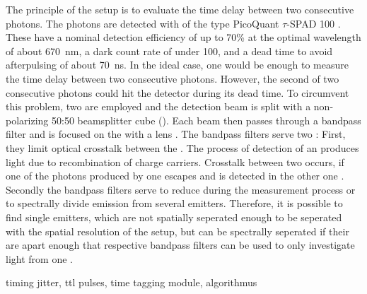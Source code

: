 		The principle of the \hbt setup is to evaluate the time delay between two consecutive photons. 
		The photons are detected with \apds of the type PicoQuant $\tau${}-SPAD 100 .
		These \apds have a nominal detection efficiency of up to 70\% at the optimal wavelength of about \SI{670}{\nm}, a dark count rate of under \SI{100}{\cps}, and a dead time to avoid afterpulsing of about \SI{70}{\ns}.
		In the ideal case, one \APD would be enough to measure the time delay between two consecutive photons. 
		However, the second of two consecutive photons could hit the detector during its dead time.
		To circumvent this problem, two \APDs are employed and the detection beam is split with a non-polarizing 50:50 beamsplitter cube ().
		Each beam then passes through a bandpass filter and is focused on the \apd with a lens .
		The bandpass filters serve two :
		First, they limit optical crosstalk between the \apds. 
		The process of detection of an \apd produces light due to recombination of charge carriers. 
		Crosstalk between two \apds occurs, if one of the photons produced by one \apd escapes and is detected in the other one \cite{Younger2009}.  
		Secondly the bandpass filters serve to reduce \bkg during the \gt measurement process or to spectrally divide emission from several emitters.
		Therefore, it is possible to find single emitters, which are not spatially seperated enough to be seperated with the spatial resolution of the setup, but can be spectrally seperated if their \ZPLs are apart enough that respective bandpass filters can be used to only investigate light from one \ZPL.


		timing jitter, ttl pulses, time tagging module, algorithmus




